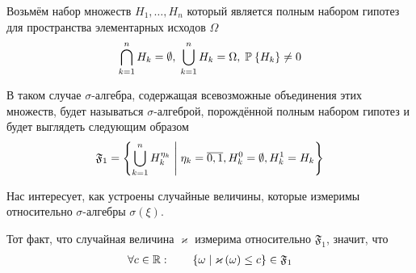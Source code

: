 \begin{definition}
  Возьмём набор множеств $H_1, \dots, H_n$ который является полным набором
  гипотез для пространства элементарных исходов $\Omega$
  $$\bigcap_{k=1}^n H_k = \emptyset,\; \bigcup_{k=1}^n H_k = \Omega,\;
      \mathbb{P}_{{}}\left\{ H_k \right\} \neq 0$$

  В таком случае $\sigma$-алгебра, содержащая всевозможные объединения этих
  множеств, будет называться $\sigma$-алгеброй, порождённой полным набором
  гипотез и будет выглядеть следующим образом
  $$\mathfrak{F}_1 = \left\{ \bigcup_{k=1}^n H_k^{\eta_k}
      \;\middle|\; \eta_k = \overline{0,1},
      H_k^0 = \emptyset, H_k^1 = H_k \right\}$$
\end{definition}

Нас интересует, как устроены случайные величины,
которые измеримы относительно $\sigma$-алгебры $\sigma\left( \xi \right)$.

\begin{definition}
  Тот факт, что случайная величина $\varkappa$ измерима относительно
  $\mathfrak{F}_1$, значит, что
  \begin{align*}
      \forall c \in \mathbb{R}:\qquad
      \left\{ \omega \;\middle|\; \varkappa\left( \omega \right) \le c \right\}
      \in \mathfrak{F}_1
  \end{align*}
\end{definition}

